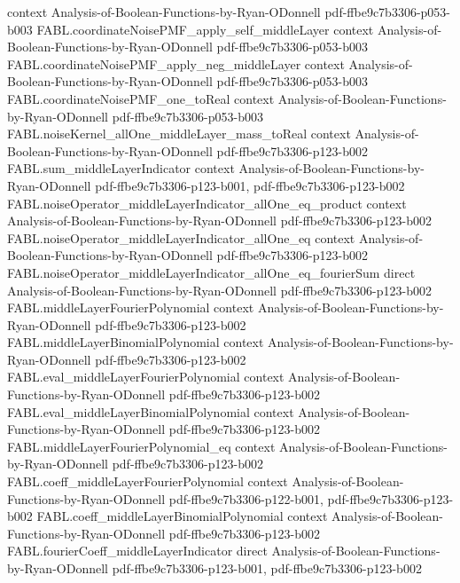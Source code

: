 \begin{theorem}
  {context}
  {Analysis-of-Boolean-Functions-by-Ryan-ODonnell}
  {pdf-ffbe9c7b3306-p053-b003}
\proofstep
  {FABL.coordinateNoisePMF_apply_self_middleLayer}
  {context}
  {Analysis-of-Boolean-Functions-by-Ryan-ODonnell}
  {pdf-ffbe9c7b3306-p053-b003}
\proofstep
  {FABL.coordinateNoisePMF_apply_neg_middleLayer}
  {context}
  {Analysis-of-Boolean-Functions-by-Ryan-ODonnell}
  {pdf-ffbe9c7b3306-p053-b003}
\proofstep
  {FABL.coordinateNoisePMF_one_toReal}
  {context}
  {Analysis-of-Boolean-Functions-by-Ryan-ODonnell}
  {pdf-ffbe9c7b3306-p053-b003}
\proofstep
  {FABL.noiseKernel_allOne_middleLayer_mass_toReal}
  {context}
  {Analysis-of-Boolean-Functions-by-Ryan-ODonnell}
  {pdf-ffbe9c7b3306-p123-b002}
\proofstep
  {FABL.sum_middleLayerIndicator}
  {context}
  {Analysis-of-Boolean-Functions-by-Ryan-ODonnell}
  {pdf-ffbe9c7b3306-p123-b001,
    pdf-ffbe9c7b3306-p123-b002}
\proofstep
  {FABL.noiseOperator_middleLayerIndicator_allOne_eq_product}
  {context}
  {Analysis-of-Boolean-Functions-by-Ryan-ODonnell}
  {pdf-ffbe9c7b3306-p123-b002}
\proofstep
  {FABL.noiseOperator_middleLayerIndicator_allOne_eq}
  {context}
  {Analysis-of-Boolean-Functions-by-Ryan-ODonnell}
  {pdf-ffbe9c7b3306-p123-b002}
\proofstep
  {FABL.noiseOperator_middleLayerIndicator_allOne_eq_fourierSum}
  {direct}
  {Analysis-of-Boolean-Functions-by-Ryan-ODonnell}
  {pdf-ffbe9c7b3306-p123-b002}
\proofstep
  {FABL.middleLayerFourierPolynomial}
  {context}
  {Analysis-of-Boolean-Functions-by-Ryan-ODonnell}
  {pdf-ffbe9c7b3306-p123-b002}
\proofstep
  {FABL.middleLayerBinomialPolynomial}
  {context}
  {Analysis-of-Boolean-Functions-by-Ryan-ODonnell}
  {pdf-ffbe9c7b3306-p123-b002}
\proofstep
  {FABL.eval_middleLayerFourierPolynomial}
  {context}
  {Analysis-of-Boolean-Functions-by-Ryan-ODonnell}
  {pdf-ffbe9c7b3306-p123-b002}
\proofstep
  {FABL.eval_middleLayerBinomialPolynomial}
  {context}
  {Analysis-of-Boolean-Functions-by-Ryan-ODonnell}
  {pdf-ffbe9c7b3306-p123-b002}
\proofstep
  {FABL.middleLayerFourierPolynomial_eq}
  {context}
  {Analysis-of-Boolean-Functions-by-Ryan-ODonnell}
  {pdf-ffbe9c7b3306-p123-b002}
\proofstep
  {FABL.coeff_middleLayerFourierPolynomial}
  {context}
  {Analysis-of-Boolean-Functions-by-Ryan-ODonnell}
  {pdf-ffbe9c7b3306-p122-b001,
    pdf-ffbe9c7b3306-p123-b002}
\proofstep
  {FABL.coeff_middleLayerBinomialPolynomial}
  {context}
  {Analysis-of-Boolean-Functions-by-Ryan-ODonnell}
  {pdf-ffbe9c7b3306-p123-b002}
\proofstep
  {FABL.fourierCoeff_middleLayerIndicator}
  {direct}
  {Analysis-of-Boolean-Functions-by-Ryan-ODonnell}
  {pdf-ffbe9c7b3306-p123-b001,
    pdf-ffbe9c7b3306-p123-b002}

\end{theorem}
